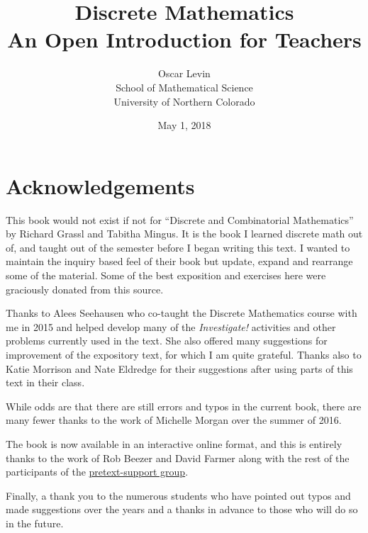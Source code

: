 \documentclass[12pt,]{book}
\title{Discrete Mathematics\\
{\large An Open Introduction for Teachers}}
\author{Oscar Levin\\
School of Mathematical Science\\
University of Northern Colorado
}
\date{May 1, 2018}
\theoremstyle{plain}
\theoremstyle{definition}
\theoremstyle{definition}
\theoremstyle{definition}
\numberwithin{equation}{chapter}
\begin{document}
\frontmatter


\chapter*{Acknowledgements}\label{acknowledgement-1}
\hypertarget{p-1}{}%
This book would not exist if not for ``Discrete and Combinatorial Mathematics'' by Richard Grassl and Tabitha Mingus. It is the book I learned discrete math out of, and taught out of the semester before I began writing this text. I wanted to maintain the inquiry based feel of their book but update, expand and rearrange some of the material.  Some of the best exposition and exercises here were graciously donated from this source.%
\par
\hypertarget{p-2}{}%
Thanks to Alees Seehausen who co-taught the Discrete Mathematics course with me in 2015 and helped develop many of the \emph{Investigate!} activities and other problems currently used in the text. She also offered many suggestions for improvement of the expository text, for which I am quite grateful. Thanks also to Katie Morrison and Nate Eldredge for their suggestions after using parts of this text in their class.%
\par
\hypertarget{p-3}{}%
While odds are that there are still errors and typos in the current book, there are many fewer thanks to the work of Michelle Morgan over the summer of 2016.%
\par
\hypertarget{p-4}{}%
The book is now available in an interactive online format, and this is entirely thanks to the work of Rob Beezer and David Farmer along with the rest of the participants of the \href{https://groups.google.com/forum/\#!forum/pretext-support}{pretext-support group}.%
\par
\hypertarget{p-5}{}%
Finally, a thank you to the numerous students who have pointed out typos and made suggestions over the years and a thanks in advance to those who will do so in the future.%
\end{document}
